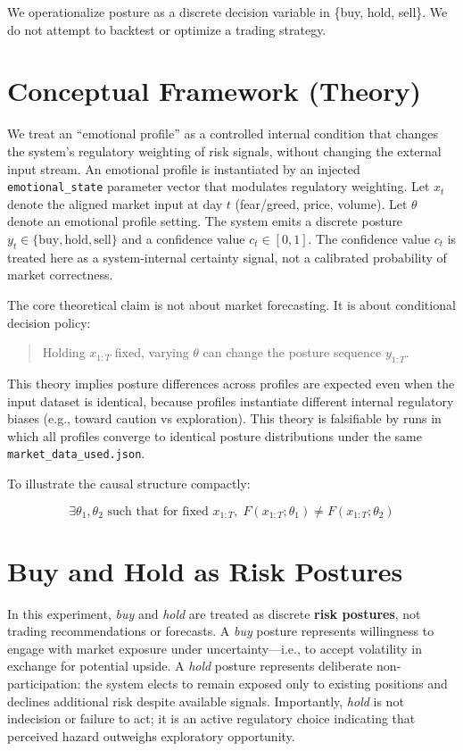 \documentclass[12pt,a4paper]{report}
\begin{document}
We operationalize posture as a discrete decision variable in \{buy, hold, sell\}. We do not attempt to backtest or optimize a trading strategy.

\section{Conceptual Framework (Theory)}

We treat an ``emotional profile'' as a controlled internal condition that changes the system's regulatory weighting of risk signals, without changing the external input stream. An emotional profile is instantiated by an injected \texttt{emotional\_state} parameter vector that modulates regulatory weighting. Let $x_t$ denote the aligned market input at day $t$ (fear/greed, price, volume). Let $\theta$ denote an emotional profile setting. The system emits a discrete posture $y_t \in \{\text{buy}, \text{hold}, \text{sell}\}$ and a confidence value $c_t \in [0,1]$. The confidence value $c_t$ is treated here as a system-internal certainty signal, not a calibrated probability of market correctness.

The core theoretical claim is not about market forecasting. It is about conditional decision policy:

\begin{quote}
Holding $x_{1:T}$ fixed, varying $\theta$ can change the posture sequence $y_{1:T}$.
\end{quote}

This theory implies posture differences across profiles are expected even when the input dataset is identical, because profiles instantiate different internal regulatory biases (e.g., toward caution vs exploration). This theory is falsifiable by runs in which all profiles converge to identical posture distributions under the same \texttt{market\_data\_used.json}.

To illustrate the causal structure compactly:

\[
\exists \theta_1, \theta_2 \text{ such that for fixed } x_{1:T},\;
F(x_{1:T}; \theta_1) \neq F(x_{1:T}; \theta_2)
\]

\section{Buy and Hold as Risk Postures}

In this experiment, \emph{buy} and \emph{hold} are treated as discrete \textbf{risk postures}, not trading recommendations or forecasts. A \emph{buy} posture represents willingness to engage with market exposure under uncertainty—i.e., to accept volatility in exchange for potential upside. A \emph{hold} posture represents deliberate non-participation: the system elects to remain exposed only to existing positions and declines additional risk despite available signals. Importantly, \emph{hold} is not indecision or failure to act; it is an active regulatory choice indicating that perceived hazard outweighs exploratory opportunity.
\end{document}
